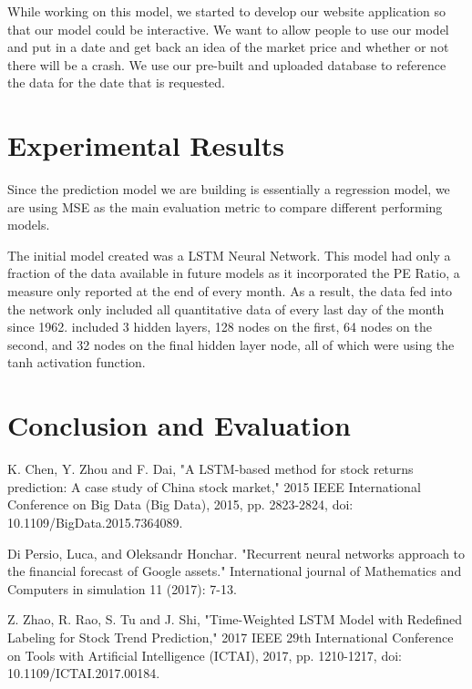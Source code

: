 \documentclass{article}
\begin{document}
While working on this model, we started to develop our website application so that our model could be interactive. We want to allow people to use our model and put in a date and get back an idea of the market price and whether or not there will be a crash. We use our pre-built and uploaded database to reference the data for the date that is requested.


\section{Experimental Results} 

Since the prediction model we are building is essentially a regression model, we are using MSE as the main evaluation metric to compare different performing models. 

The initial model created was a LSTM Neural Network. This model had only a fraction of the data available in future models as it incorporated the PE Ratio, a measure only reported at the end of every month. As a result, the data fed into the network only included all quantitative data of every last day of the month since 1962. included 3 hidden layers, 128 nodes on the first, 64 nodes on the second, and 32 nodes on the final hidden layer node, all of which were using the tanh activation function.


\section{Conclusion and Evaluation} 

\begin{thebibliography}{9}
K. Chen, Y. Zhou and F. Dai, "A LSTM-based method for stock returns prediction: A case study of China stock market," 2015 IEEE International Conference on Big Data (Big Data), 2015, pp. 2823-2824, doi: 10.1109/BigData.2015.7364089.

Di Persio, Luca, and Oleksandr Honchar. "Recurrent neural networks approach to the financial forecast of Google assets." International journal of Mathematics and Computers in simulation 11 (2017): 7-13.

Z. Zhao, R. Rao, S. Tu and J. Shi, "Time-Weighted LSTM Model with Redefined Labeling for Stock Trend Prediction," 2017 IEEE 29th International Conference on Tools with Artificial Intelligence (ICTAI), 2017, pp. 1210-1217, doi: 10.1109/ICTAI.2017.00184.

\end{thebibliography}
\end{document}
